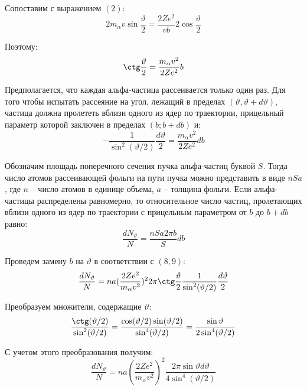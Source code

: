 \documentclass{article}
\begin{document}
	Сопоставим с выражением $(2)$:
	\begin{equation}
		2m_\alpha v\sin\frac{\vartheta}{2} = \frac{2Ze^2}{vb}2\cos\frac{\vartheta}{2}
	\end{equation}

	Поэтому:
	\begin{equation}
		\ctg\frac{\vartheta}{2} = \frac{m_\alpha v^2}{2Ze^2}b
	\end{equation}

	Предполагается, что каждая альфа-частица рассеивается только один раз. Для того чтобы испытать рассеяние на угол, лежащий в пределах $(\vartheta,\vartheta+d\vartheta)$, частица должна пролететь вблизи одного из ядер по траектории, прицельный параметр которой заключен в пределах $(b;b+db)$ и:
	\begin{equation}
		-\frac{1}{\sin^2 (\vartheta/2)}\frac{d\vartheta}{2} = \frac{m_\alpha v^2}{2Ze^2} db
	\end{equation}

	Обозначим площадь поперечного сечения пучка альфа-частиц буквой $S$. Тогда число атомов рассеивающей фольги на пути пучка можно представить в виде $nSa$, где $n$ -- число атомов в единице объема, $a$ -- толщина фольги. Если альфа-частицы распределены равномерно, то относительное число частиц, пролетающих вблизи одного из ядер по траектории с прицельным параметром от $b$ до $b+db$ равно:
	\begin{equation}
		\frac{dN_\vartheta}{N} = \frac{nSa2\pi b}{S}db
	\end{equation}

	Проведем замену $b$ на $\vartheta$ в соответствии с $(8, 9)$:
	\begin{equation}
		\frac{dN_\vartheta}{N} = na(\frac{2Ze^2}{m_\alpha v^2})^2 2\pi\ctg\frac{\vartheta}{2}\frac{1}{\sin^2 (\vartheta/2)}\frac{d\vartheta}{2}
	\end{equation}

	Преобразуем множители, содержащие $\vartheta$:
	\begin{equation}
		\frac{\ctg(\vartheta/2)}{\sin^2(\vartheta/2)} = \frac{\cos(\vartheta/2)\sin(\vartheta/2)}{\sin^4(\vartheta/2)} = \frac{\sin\vartheta}{2\sin^4 (\vartheta/2)}
	\end{equation}

	С учетом этого преобразования получим:
	\begin{equation}
		\frac{dN_\vartheta}{N} = na(\frac{2Ze^2}{m_\alpha v^2})^2\frac{2\pi\sin\vartheta d\vartheta}{4\sin^4 (\vartheta/2)}
	\end{equation}
\end{document}
